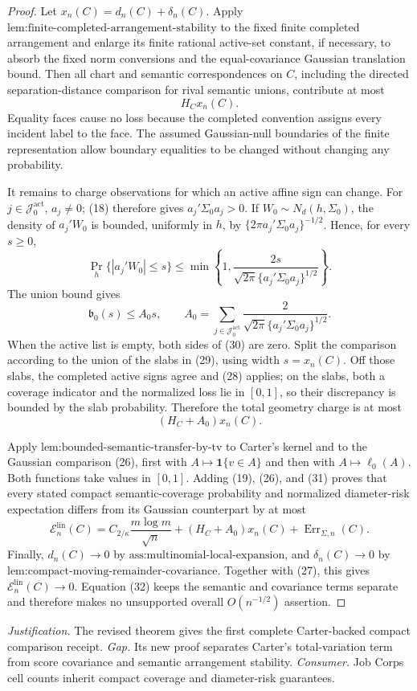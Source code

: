 \documentclass{article}
\begin{document}
\begin{proof}
Let \(x_n(C)=d_n(C)+\delta_n(C)\).  Apply \(\text{lem:finite-completed-arrangement-stability}\) to the fixed finite completed arrangement and enlarge its finite rational active-set constant, if necessary, to absorb the fixed norm conversions and the equal-covariance Gaussian translation bound.  Then all chart and semantic correspondences on \(C\), including the directed separation-distance comparison for rival semantic unions, contribute at most
\[
 H_Cx_n(C).
 \tag{28}
\]
Equality faces cause no loss because the completed convention assigns every incident label to the face.  The assumed Gaussian-null boundaries of the finite representation allow boundary equalities to be changed without changing any probability.

It remains to charge observations for which an active affine sign can change.  For \(j\in\mathcal J_0^{\mathrm{act}}\), \(a_j\ne0\); (18) therefore gives \(a_j'\Sigma_0a_j>0\).  If \(W_0\sim N_d(h,\Sigma_0)\), the density of \(a_j'W_0\) is bounded, uniformly in \(h\), by \(\{2\pi a_j'\Sigma_0a_j\}^{-1/2}\).  Hence, for every \(s\ge0\),
\[
 \Pr_h\{|a_j'W_0|\le s\}
 \le\min\left\{1,
 \frac{2s}{\sqrt{2\pi}\{a_j'\Sigma_0a_j\}^{1/2}}
 \right\}.
 \tag{29}
\]
The union bound gives
\[
 \mathfrak b_0(s)\le A_0s,
 \qquad
 A_0=\sum_{j\in\mathcal J_0^{\mathrm{act}}}
 \frac{2}{\sqrt{2\pi}\{a_j'\Sigma_0a_j\}^{1/2}}.
 \tag{30}
\]
When the active list is empty, both sides of (30) are zero.  Split the comparison according to the union of the slabs in (29), using width \(s=x_n(C)\).  Off those slabs, the completed active signs agree and (28) applies; on the slabs, both a coverage indicator and the normalized loss lie in \([0,1]\), so their discrepancy is bounded by the slab probability.  Therefore the total geometry charge is at most
\[
 (H_C+A_0)x_n(C).
 \tag{31}
\]

Apply \(\text{lem:bounded-semantic-transfer-by-tv}\) to Carter's kernel and to the Gaussian comparison (26), first with \(A\mapsto\mathbf1\{v\in A\}\) and then with \(A\mapsto\ell_0(A)\).  Both functions take values in \([0,1]\).  Adding (19), (26), and (31) proves that every stated compact semantic-coverage probability and normalized diameter-risk expectation differs from its Gaussian counterpart by at most
\[
 \mathcal E_n^{\mathrm{lin}}(C)
 =C_{2/\kappa}\frac{m\log m}{\sqrt n}
 +(H_C+A_0)x_n(C)+\operatorname{Err}_{\Sigma,n}(C).
 \tag{32}
\]
Finally, \(d_n(C)\to0\) by \(\text{ass:multinomial-local-expansion}\), and \(\delta_n(C)\to0\) by \(\text{lem:compact-moving-remainder-covariance}\).  Together with (27), this gives \(\mathcal E_n^{\mathrm{lin}}(C)\to0\).  Equation (32) keeps the semantic and covariance terms separate and therefore makes no unsupported overall \(O(n^{-1/2})\) assertion.
\end{proof}
\par\smallskip\noindent \textit{Justification.} The revised theorem gives the first complete Carter-backed compact comparison receipt. \textit{Gap.} Its new proof separates Carter's total-variation term from score covariance and semantic arrangement stability. \textit{Consumer.} Job Corps cell counts inherit compact coverage and diameter-risk guarantees.
\end{document}
